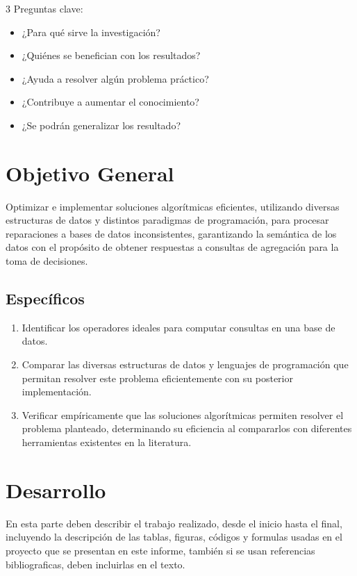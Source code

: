 \documentclass[a0,portrait]{a0poster}
\begin{document}
\begin{multicols}{3}
Preguntas clave:
  \begin{itemize}
  \item ¿Para qué sirve la investigación?
  \item ¿Quiénes se benefician con los resultados?
  \item ¿Ayuda a resolver algún problema práctico?
  \item ¿Contribuye a aumentar el conocimiento?
  \item ¿Se podrán generalizar los resultado?
\end{itemize}

\section*{Objetivo General}
Optimizar e implementar soluciones algorítmicas eficientes, utilizando diversas estructuras de datos y distintos paradigmas de programación, para procesar reparaciones a bases de datos inconsistentes, garantizando la semántica de los datos con el propósito de obtener respuestas a consultas de agregación para la toma de decisiones.
\subsection*{Específicos}
\begin{enumerate}
 \item Identificar los operadores ideales para computar consultas en una base de datos.
\item Comparar las diversas estructuras de datos y lenguajes de programación que permitan resolver este problema eficientemente con su posterior implementación.
\item Verificar empíricamente que las soluciones algorítmicas permiten resolver el problema planteado, determinando su eficiencia al compararlos con diferentes herramientas existentes en la literatura.
\end{enumerate}



\section*{Desarrollo}

En esta parte deben describir el trabajo realizado, desde el inicio hasta el final, incluyendo la descripción de las tablas, figuras, códigos y formulas usadas en el proyecto que se presentan en este informe, también si se usan referencias bibliograficas, deben incluirlas en el texto.


\end{multicols}
\end{document}
